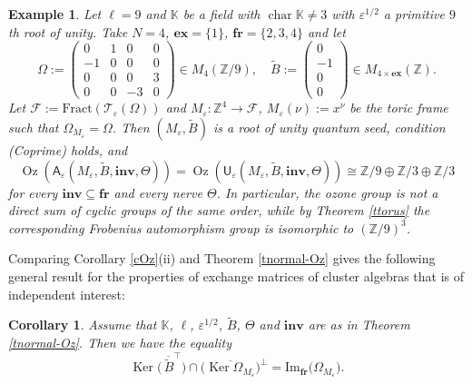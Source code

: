 \documentclass[11pt]{amsart}
\theoremstyle{plain}
\newtheorem{corollary}[theorem]{Corollary}
\newtheorem{example}[theorem]{Example}
\newcommand \bco[1] { \begin{corollary}\label{c#1} }
\newcommand \bex[1] { \begin{example}\label{e#1}\rm }
\newcommand {\eco} { \end{corollary} }
\newcommand {\eex} { \end{example} }
\newcommand \thref[1]{Theorem \ref{t#1}}
\newcommand \coref[1]{Corollary \ref{c#1}}
\def \KK {{\mathbb C}}
\def \KK {{\mathbb K}}
\def \Zset {{\mathbb Z}}
\def \A {{\boldsymbol{\mathsf A}}}
\def \U {{\boldsymbol{\mathsf U}}}
\def \B  {{\widetilde{B}}}
\newcommand \ex {{\mathbf{ex}}}
\newcommand \fr {{\mathbf{fr}}}
\newcommand \inv {{\mathbf{inv}}}
\def \TT {{\mathcal{T}}}
\def \FF {{\mathcal{F}}}
\def \Om {\Omega}
\def \ep {\varepsilon}
\def \ol {\overline}
\DeclareMathOperator \Oz { {\mathrm{Oz}}}
\DeclareMathOperator \charr { {\mathrm{char}} }
\DeclareMathOperator \Ker { {\mathrm{Ker}} }
\renewcommand \Im { {\mathrm{Im}} }
\newcommand \Fract {{\mathrm{Fract}}}
\begin{document}
\bex{non-cycl}
    Let $\ell=9$ and $\KK$ be a field with $\charr \KK \neq 3$ with $\ep^{1/2}$ a primitive $9$th root of unity. Take $N=4$, $\ex = \{1\}$, $\fr = \{2,3,4\}$ and let 
    \begin{equation}
    \Omega :=\begin{pmatrix}
             0 & 1 & 0 & 0\\
             -1 & 0 & 0 & 0\\
             0 & 0 & 0 & 3\\
             0 & 0 & -3 &0
            \end{pmatrix} \in M_4(\Zset/9), \quad \widetilde{B} := \begin{pmatrix}
                0\\-1\\0\\0
            \end{pmatrix} \in M_{4\times \ex}(\Zset).
    \end{equation}
    Let $\FF :=\Fract(\TT_\ep(\Omega))$ and $M_\ep : \Zset^4 \rightarrow \FF$, $M_\ep(\nu) := x^\nu$ be the toric frame such that $\Omega_{M_\ep} = \Omega$. Then $(M_\ep, \widetilde{B})$ is a root of unity quantum seed, condition (Coprime) holds, and $$\Oz(\A_\ep(M_\ep,\widetilde{B},\inv,\Theta)) = \Oz(\U_\ep(M_\ep,\widetilde{B},\inv,\Theta)) \cong \Zset/9 \oplus \Zset / 3 \oplus \Zset / 3$$
    for every $\inv \subseteq \fr$ and every nerve $\Theta$. In particular, the ozone group is not a direct sum of cyclic groups of the same order, while by \thref{torus} the corresponding Frobenius automorphism group is isomorphic to $(\Zset/9)^3$.
\eex

Comparing \coref{Oz}(ii) and \thref{normal-Oz} gives the following general result for the properties of exchange matrices of cluster algebras that is of independent interest:
\bco{equality} Assume that $\KK$, $\ell$, $\ep^{1/2}$, $\B$, $\Theta$ and $\inv$ are as in \thref{normal-Oz}.
Then we have the equality 
\[
\Ker \big( \, \ol{\B}^\top \big) \cap \big( \ol{\Ker \Om_{M_\ep} }\big)^\perp = \Im_{\fr} \big( \Om_{M_\ep} \big).
\]
\eco
\end{document}
